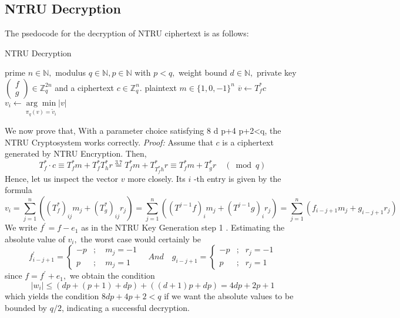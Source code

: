 \subsection{NTRU Decryption}
The psedocode for the decryption of NTRU ciphertext is as follows:
\begin{algorithm}[h]
        \caption{NTRU Decryption}
        \begin{algorithmic}[1] %
            \Require prime $n \in \mathbb{N},$ modulus $q \in \mathbb{N}, p \in \mathbb{N}$ with $p<q,$ weight bound $d \in \mathbb{N},$ private key $\left(\begin{array}{l}{f} \\ {g}\end{array}\right) \in \mathbb{Z}_{q}^{2 n}$ and a ciphertext $c \in \mathbb{Z}_{q}^{n}$.
            \Ensure plaintext $m \in\{1,0,-1\}^{n}$
            \State $\overline{v} \leftarrow T_{f}^{*} c$
                \State $v_{i} \leftarrow \underset{\pi_{q}(v)=\tilde{v}_{i}}{\arg \min }|v|$
             \EndFor
             \State {}  
        \end{algorithmic}
    \end{algorithm} 
We now prove that, With a parameter choice satisfying 8 d p+4 p+2<q, the NTRU Cryptosystem works correctly.
\newline
\emph{Proof: } Assume that $c$ is a ciphertext generated by NTRU Encryption. Then,\newline
\begin{equation}
    T_{f}^{*} \cdot c \equiv T_{f}^{*} m+T_{f}^{*} T_{h}^{*} r \stackrel{3.7}{=} T_{f}^{*} m+T_{T_{f}^{*}h}^{*} r \equiv T_{f}^{*} m+T_{g}^{*} r \quad(\bmod q)
\end{equation}
Hence, let us inspect the vector $v$ more closely. Its $i$ -th entry is given by the formula\newline
\begin{equation}
    v_{i}=\sum_{j=1}^{n}\left(\left(T_{f}^{*}\right)_{i j} m_{j}+\left(T_{g}^{*}\right)_{i j} r_{j}\right)=\sum_{j=1}^{n}\left(\left(T^{j-1} f\right)_{i} m_{j}+\left(T^{j-1} g\right)_{i} r_{j}\right) = \sum_{j=1}^{n}\left(f_{i-j+1} m_{j}+g_{i-j+1} r_{j}\right)
\end{equation}
We write $f^{\prime}=f-e_{1}$ as in the NTRU Key Generation step 1 . Estimating the absolute value of $v_{i},$ the worst case would certainly be
\begin{equation}
    f_{i-j+1}^{\prime}=\left\{\begin{aligned}-p & { ;} \quad m_{j}=-1 \\ p & { ;} \quad m_{j}=1 \end{aligned}\right.\quad And\quad g_{i-j+1}=\left\{\begin{array}{rlr}{-p} & { ;} & {r_{j}=-1} \\ {p} & { ;} & {r_{j} = 1}\end{array}\right.
\end{equation}
since $f=f^{\prime}+e_{1},$ we obtain the condition 
\begin{equation}
    \left|w_{i}\right| \leq(d p+(p+1)+d p)+((d+1) p+d p)=4 d p+2 p+1
\end{equation}
which yields the condition $8 d p+4 p+2<q$ if we want the absolute values to be bounded by $q / 2$, indicating a successful decryption.